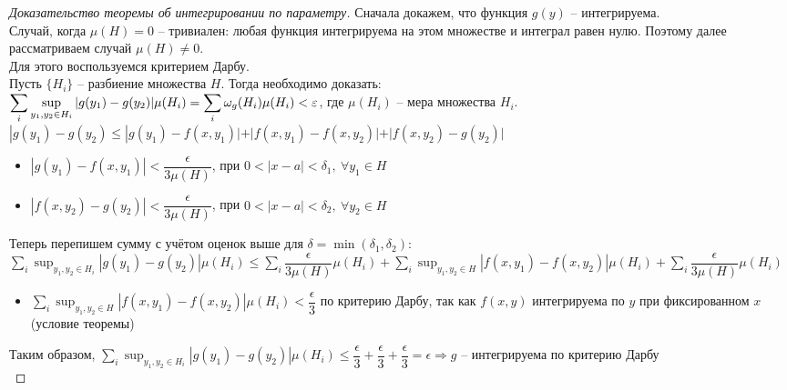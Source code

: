 \begin{proof}[Доказательство теоремы об интегрировании по параметру]
    Сначала докажем, что функция $g(y)$ -- интегрируема. \\
    Случай, когда $\mu(H) = 0$ -- тривиален: любая функция интегрируема на этом множестве 
    и интеграл равен нулю. Поэтому далее рассматриваем случай $\mu(H) \neq 0$. \\  
    Для этого воспользуемся критерием Дарбу.\\
    Пусть $\{H_i\}$ -- разбиение множества $H$. Тогда необходимо доказать: \\
    $\displaystyle \sum_{i} \sup_{y_1, y_2 \in H_i} |g(y_1) - g(y_2)| \mu(H_i) =
    \sum_{i} \omega_{g}(H_i) \mu(H_i) < \varepsilon$, где $\mu(H_i)$ -- мера множества $H_i$. \\ 
    $|g(y_1) - g(y_2) \leqslant |g(y_1) - f(x, y_1)| + |f(x, y_1) - f(x, y_2)| 
    + |f(x, y_2) - g(y_2)|$
    \begin{itemize}
        \item $|g(y_1) - f(x, y_1)| < \dfrac{\epsilon}{3 \mu(H)}$,
        при $ 0 < |x - a| < \delta_1, \ \forall y_1 \in H$
        \item $|f(x, y_2) - g(y_2)| < \dfrac{\epsilon}{3 \mu(H)}$,
        при $ 0 < |x - a| < \delta_2, \ \forall y_2 \in H$
    \end{itemize} 
    Теперь перепишем сумму с учётом оценок выше для $\delta = \min(\delta_1, \delta_2)$: \\
     $\displaystyle \sum_{i} \sup_{y_1, y_2 \in H_i} |g(y_1) - g(y_2)| \mu(H_i) \leqslant
    \sum_i \dfrac{\epsilon}{3 \mu(H)} \mu(H_i) + 
    \sum_i \sup_{y_1, y_2 \in H} |f(x, y_1) - f(x, y_2)| \mu(H_i) +
    \sum_i \dfrac{\epsilon}{3 \mu(H)} \mu(H_i)$ \\
    \begin{itemize}
        \item $\displaystyle \sum_i \sup_{y_1, y_2 \in H} |f(x, y_1) - f(x, y_2)| \mu(H_i) 
        < \dfrac{\epsilon}{3}$ по критерию Дарбу, так как $f(x, y)$ интегрируема по $y$ при
        фиксированном $x$ (условие теоремы)
    \end{itemize} 
    Таким образом, $\displaystyle \sum_{i} \sup_{y_1, y_2 \in H_i} |g(y_1) - g(y_2)| \mu(H_i)
    \leqslant \dfrac{\epsilon}{3} + \dfrac{\epsilon}{3} + \dfrac{\epsilon}{3} = \epsilon
    \Rightarrow g$ -- интегрируема по критерию Дарбу \\
    

\end{proof}
